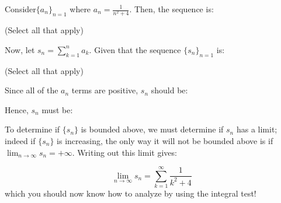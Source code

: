 \documentclass{ximera}
\author{Jim Talamo}
\begin{document}
\begin{exercise}
Consider$\{a_n \}_{n=1}$ where $a_n = \frac{1}{n^2+4}$.  Then, the sequence is:

\begin{selectAll}
\end{selectAll}
(Select all that apply)

Now, let $s_n = \sum_{k=1}^{n} a_k$.  Given that the sequence $\{s_n \}_{n=1}$ is:
\begin{selectAll}
\end{selectAll}
(Select all that apply)

\begin{hint}
Since all of the $a_n$ terms are positive, $s_n$ should be:

\begin{multipleChoice}
\end{multipleChoice}

Hence, $s_n$ must be:
\begin{multipleChoice}
\end{multipleChoice}

To determine if $\{s_n\}$ is bounded above, we must determine if $s_n$ has a limit; indeed if $\{s_n\}$ is increasing, the only way it will not be bounded above is if $\lim_{n \to \infty} s_n = +\infty$.  Writing out this limit gives:

\[
\lim_{n \to \infty} s_n = \sum_{k=1}^{\infty}  \frac{1}{k^2+4}
\]
which you should now know how to analyze by using the integral test!
\end{hint}
\end{exercise}
\end{document}
